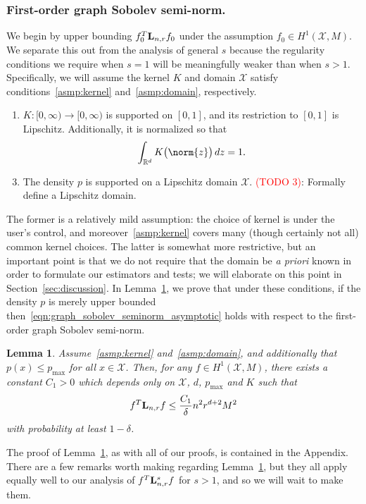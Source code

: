 \documentclass{article}
\newcommand{\Reals}{\mathbb{R}}
\newcommand{\1}{\mathbf{1}}
\newcommand{\Lap}{{\bf L}}
\newcommand{\Xset}{\mathcal{X}}
\theoremstyle{alden}
\theoremstyle{aldenthm}
\newtheorem{lemma}{Lemma}
\theoremstyle{definition}
\theoremstyle{remark}
\begin{document}
\subsubsection{First-order graph Sobolev semi-norm.}
\label{subsec:first_order_graph_sobolev_seminorm}
We begin by upper bounding $f_0^T \Lap_{n,r} f_0$ under the assumption $f_0 \in H^1(\Xset,M)$. We separate this out from the analysis of general $s$ because the regularity conditions we require when $s = 1$ will be meaningfully weaker than when $s > 1$. Specifically, we will assume the kernel $K$ and domain $\Xset$ satisfy conditions~\ref{asmp:kernel} and~\ref{asmp:domain}, respectively.
\begin{enumerate}[label=(K\arabic*)]
	\item
	\label{asmp:kernel}
	$K:[0,\infty) \to [0,\infty)$ is supported on $[0,1]$, and its restriction to $[0,1]$ is Lipschitz. Additionally, it is normalized so that
	\begin{equation*}
	\int_{\Reals^d} K\bigl(\norm{z}\bigr) \,dz = 1.
	\end{equation*}
\end{enumerate}
\begin{enumerate}[label=(P\arabic*)]
	\setcounter{enumi}{2}
	\item 
	\label{asmp:domain}
	The density $p$ is supported on a Lipschitz domain $\Xset$. \textcolor{red}{(TODO 3)}: Formally define a Lipschitz domain.
\end{enumerate}
The former is a relatively mild assumption: the choice of kernel is under the user's control, and moreover~\ref{asmp:kernel} covers many (though certainly not all) common kernel choices. The latter is somewhat more restrictive, but an important point is that we do not require that the domain be \textit{a priori} known in order to formulate our estimators and tests; we will elaborate on this point in Section~\ref{sec:discussion}. In Lemma~\ref{lem:first_order_graph_sobolev_seminorm}, we prove that under these conditions, if the density $p$ is merely upper bounded then~\eqref{eqn:graph_sobolev_seminorm_asymptotic} holds with respect to the first-order graph Sobolev semi-norm.
\begin{lemma}
	\label{lem:first_order_graph_sobolev_seminorm}
	Assume~\ref{asmp:kernel} and~\ref{asmp:domain}, and additionally that $p(x) \leq p_{\max}$ for all $x \in \Xset$. Then, for any $f \in H^1(\Xset,M)$, there exists a constant $C_1 > 0$ which depends only on $\Xset$, $d$, $p_{\max}$ and $K$ such that
	\begin{equation}
	\label{eqn:first_order_graph_sobolev_seminorm}
	f^T \Lap_{n,r} f \leq \frac{C_1}{\delta} n^2 r^{d + 2} M^2
	\end{equation}
	with probability at least $1 - \delta$.
\end{lemma}
The proof of Lemma~\ref{lem:first_order_graph_sobolev_seminorm}, as with all of our proofs, is contained in the Appendix. There are a few remarks worth making regarding Lemma~\ref{lem:first_order_graph_sobolev_seminorm}, but they all apply equally well to our analysis of $f^T\Lap_{{n,r}}^sf$ for $s > 1$, and so we will wait to make them.
\end{document}
